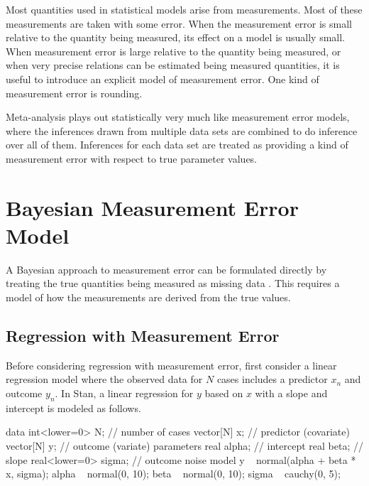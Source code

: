 \noindent
Most quantities used in statistical models arise from measurements.
Most of these measurements are taken with some error.  When the
measurement error is small relative to the quantity being measured,
its effect on a model is usually small.  When measurement error is
large relative to the quantity being measured, or when very precise
relations can be estimated being measured quantities, it is useful to
introduce an explicit model of measurement error.  One kind of
measurement error is rounding.

Meta-analysis plays out statistically very much like measurement error
models, where the inferences drawn from multiple data sets are
combined to do inference over all of them.  Inferences for each data
set are treated as providing a kind of measurement error with respect
to true parameter values.


\section{Bayesian Measurement Error Model}

A Bayesian approach to measurement error can be formulated directly by
treating the true quantities being measured as missing data
\citep{Clayton:1992, RichardsonGilks:1993}.  This requires a model of
how the measurements are derived from the true values.

\subsection{Regression with Measurement Error}

Before considering regression with measurement error, first consider a
linear regression model where the observed data for $N$ cases includes
a predictor $x_n$ and outcome $y_n$.  In Stan, a linear regression for
$y$ based on $x$ with a slope and intercept is modeled as follows.
%
\begin{stancode}
data {
  int<lower=0> N;       // number of cases
  vector[N] x;          // predictor (covariate)
  vector[N] y;          // outcome (variate)
}
parameters {
  real alpha;           // intercept
  real beta;            // slope
  real<lower=0> sigma;  // outcome noise
}
model {
  y ~ normal(alpha + beta * x, sigma);
  alpha ~ normal(0, 10);
  beta ~ normal(0, 10);
  sigma ~ cauchy(0, 5);
}
\end{stancode}
%

